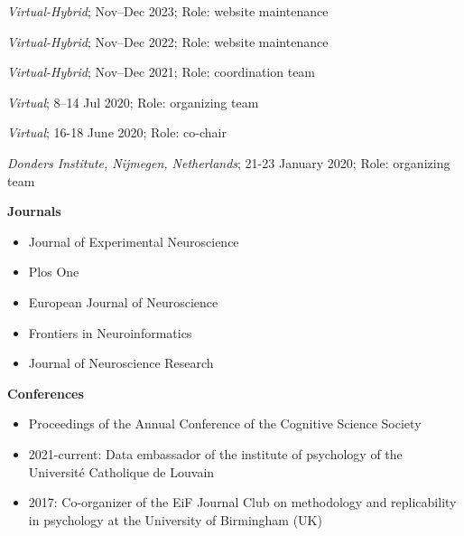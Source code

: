
\textit{Virtual-Hybrid};
Nov--Dec 2023;
Role: website maintenance

\textit{Virtual-Hybrid};
Nov--Dec 2022;
Role: website maintenance

\textit{Virtual-Hybrid};
Nov--Dec 2021;
Role: coordination team

%
\textit{Virtual};
8--14 Jul 2020;
Role: organizing team

%
\textit{Virtual};
16-18 June 2020;
Role: co-chair

%
\textit{Donders Institute, Nijmegen, Netherlands};
21-23 January 2020;
Role: organizing team



\textbf{Journals}

\begin{itemize}
    \item Journal of Experimental Neuroscience
    \item Plos One
    \item European Journal of Neuroscience
    \item Frontiers in Neuroinformatics
    \item Journal of Neuroscience Research
\end{itemize}

\textbf{Conferences}

\begin{itemize}
    \item Proceedings of the Annual Conference of the Cognitive Science Society
\end{itemize}



\begin{itemize}
    \item 2021-current: Data embassador of the institute of psychology of the Université Catholique de Louvain
    \item 2017: Co-organizer of the EiF Journal Club on methodology and replicability in psychology at the University of Birmingham (UK)
\end{itemize}

